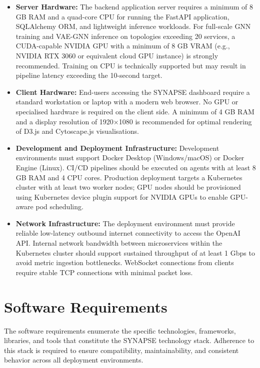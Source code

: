 \begin{itemize}

    \item \textbf{Server Hardware:} The backend application server requires a minimum of 8 GB RAM and a quad-core CPU for running the FastAPI application, SQLAlchemy ORM, and lightweight inference workloads. For full-scale GNN training and VAE-GNN inference on topologies exceeding 20 services, a CUDA-capable NVIDIA GPU with a minimum of 8 GB VRAM (e.g., NVIDIA RTX 3060 or equivalent cloud GPU instance) is strongly recommended. Training on CPU is technically supported but may result in pipeline latency exceeding the 10-second target.

    \item \textbf{Client Hardware:} End-users accessing the SYNAPSE dashboard require a standard workstation or laptop with a modern web browser. No GPU or specialised hardware is required on the client side. A minimum of 4 GB RAM and a display resolution of 1920×1080 is recommended for optimal rendering of D3.js and Cytoscape.js visualisations.

    \item \textbf{Development and Deployment Infrastructure:} Development environments must support Docker Desktop (Windows/macOS) or Docker Engine (Linux). CI/CD pipelines should be executed on agents with at least 8 GB RAM and 4 CPU cores. Production deployment targets a Kubernetes cluster with at least two worker nodes; GPU nodes should be provisioned using Kubernetes device plugin support for NVIDIA GPUs to enable GPU-aware pod scheduling.

    \item \textbf{Network Infrastructure:} The deployment environment must provide reliable low-latency outbound internet connectivity to access the OpenAI API. Internal network bandwidth between microservices within the Kubernetes cluster should support sustained throughput of at least 1 Gbps to avoid metric ingestion bottlenecks. WebSocket connections from clients require stable TCP connections with minimal packet loss.

\end{itemize}

\section{Software Requirements}

\hspace*{0.3in} The software requirements enumerate the specific technologies, frameworks, libraries, and tools that constitute the SYNAPSE technology stack. Adherence to this stack is required to ensure compatibility, maintainability, and consistent behavior across all deployment environments.\\\\

